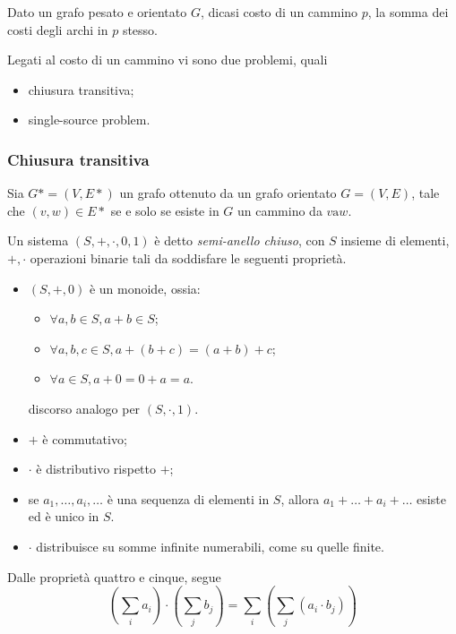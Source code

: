 \documentclass{subfiles}
\begin{document}
\begin{Definition*}
    Dato un grafo pesato e orientato \(G\), dicasi costo di un cammino \(p\), la somma dei costi degli archi in \(p\) stesso.
\end{Definition*}

\noindent Legati al costo di un cammino vi sono due problemi, quali
\begin{itemize}
    \item chiusura transitiva;
    \item single-source problem.
\end{itemize}

\subsubsection{Chiusura transitiva}
\noindent Sia \(G* = (V, E*)\) un grafo ottenuto da un grafo orientato \(G = (V, E)\), tale che \((v, w) \in E*\) se e solo se esiste in \(G\) un cammino da \(v \text{a} w\).
\begin{Definition*}
    Un sistema \((S, +, \cdot, 0, 1)\) è detto \emph{semi-anello chiuso}, con \(S\) insieme di elementi, \(+, \cdot\) operazioni binarie tali da soddisfare le seguenti proprietà.
    \begin{itemize}
        \item \((S, +, 0)\) è un monoide, ossia:
              \begin{itemize}
                  \item \(\forall a, b \in S, a + b \in S\);
                  \item \(\forall a, b, c \in S, a + (b + c) = (a + b) + c\);
                  \item \(\forall a \in S, a + 0 = 0 + a = a\).
              \end{itemize}
              discorso analogo per \((S, \cdot, 1)\).
        \item \(+\) è commutativo;
        \item \(\cdot\) è distributivo rispetto \(+\);
        \item se \(a_{1}, \ldots, a_{i}, \ldots\) è una sequenza di elementi in \(S\), allora \(a_{1} + \ldots + a_{i} + \ldots\) esiste ed è unico in \(S\).
        \item \(\cdot\) distribuisce su somme infinite numerabili, come su quelle finite.
    \end{itemize}
\end{Definition*}

\noindent Dalle proprietà quattro e cinque, segue
\[
    \left(\sum\limits_{i}{a_{i}}\right) \cdot \left(\sum\limits_{j}{b_{j}}\right) = \sum\limits_{i}\left(\sum\limits_{j}{(a_{i} \cdot b_{j})}\right)
\]
\end{document}
